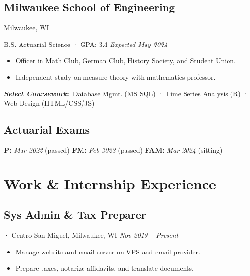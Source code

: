 \documentclass[12pt]{article}
\newcommand{\itemspace}{\vspace{0.3170em}}
\renewcommand{\textsc}[1]{\uppercase{\footnotesize#1}\normalsize}
\newcommand{\examgap}{\hspace{6.55em}}
\begin{document}
\subsection{Milwaukee School of Engineering} \hfill Milwaukee, WI

B.S. Actuarial Science · GPA: 3.4 \hfill \textit{Expected May 2024}

\begin{itemize}[noitemsep,nolistsep]
  \item Officer in Math Club, German Club, History Society, and Student Union.

  \item Independent study on measure theory with mathematics professor.
\end{itemize}

\textbf{\textit{Select Coursework}:} \,Database Mgmt. (\textsc{ms sql}) ·
Time Series Analysis (\textsc{R}) · Web Design (\textsc{html/css/js})

\itemspace

\subsection{Actuarial Exams} \hfill

\textbf{P:}\; \textit{Mar 2022} (passed)
\examgap
\textbf{FM:}\; \textit{Feb 2023} (passed)
\examgap
\textbf{FAM:}\; \textit{Mar 2024} (sitting)

\itemspace

\section{Work \& Internship Experience}

\subsection{Sys Admin \& Tax Preparer}
· Centro San Miguel, Milwaukee, WI \hfill \textit{Nov 2019 -- Present}

\begin{itemize}[noitemsep,nolistsep]
  \item Manage website and email server on VPS and email provider.

  \item Prepare taxes, notarize affidavits, and translate documents.
\end{itemize}
\end{document}
